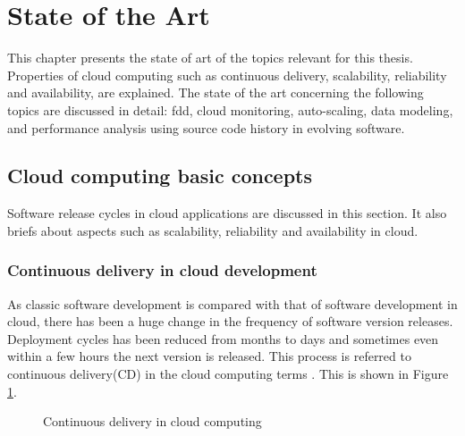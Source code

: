 \documentclass[article,type=msc,colorback,12pt,accentcolor=tud8b,table]{tudthesis}
\begin{document}

	\cleardoublepage
 
 \hfill 
 \section{State of the Art}
  \hfill \break
 	
	This chapter presents the state of art of the topics relevant for this thesis. Properties of cloud computing such as continuous delivery, scalability, reliability and availability, are explained. The state of the art concerning the following topics are discussed in detail: \gls{fdd}, cloud monitoring, auto-scaling, data modeling, and performance analysis using source code history in evolving software.
	
		\subsection{Cloud computing basic concepts}
		
		Software release cycles in cloud applications are discussed in this section. It also briefs about aspects such as scalability, reliability and availability in cloud.
		
		\subsubsection{Continuous delivery in cloud development}
		As classic software development is compared with that of software development in cloud, there has been a huge change in the frequency of software version releases. Deployment cycles has been reduced from months to days and sometimes even within a few hours the next version is released. This process is referred to continuous delivery(CD) in the cloud computing terms \cite{humble2010continuous}. This is shown in Figure \ref{fig:cd}. 
		
		\begin{figure}
			\begin{center}
				\makebox[\textwidth]{\texttt{[image: 2-1]}}
			\end{center}
			\caption{Continuous delivery in cloud computing \cite{humble2010continuous}}
			\label{fig:cd}
		\end{figure}
		
\end{document}
